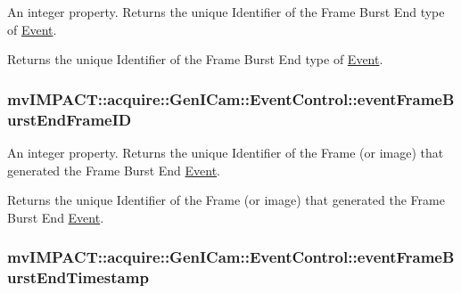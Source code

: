 An integer property. Returns the unique Identifier of the Frame Burst End type of \hyperlink{classmv_i_m_p_a_c_t_1_1acquire_1_1_event}{Event}. 

Returns the unique Identifier of the Frame Burst End type of \hyperlink{classmv_i_m_p_a_c_t_1_1acquire_1_1_event}{Event}. \hypertarget{classmv_i_m_p_a_c_t_1_1acquire_1_1_gen_i_cam_1_1_event_control_a04c309b663ab1b9c28994c92e19e8b6a}{
\subsubsection[{event\+Frame\+Burst\+End\+Frame\+I\+D}]{ mv\+I\+M\+P\+A\+C\+T\+::acquire\+::\+Gen\+I\+Cam\+::\+Event\+Control\+::event\+Frame\+Burst\+End\+Frame\+I\+D}}\label{classmv_i_m_p_a_c_t_1_1acquire_1_1_gen_i_cam_1_1_event_control_a04c309b663ab1b9c28994c92e19e8b6a}


An integer property. Returns the unique Identifier of the Frame (or image) that generated the Frame Burst End \hyperlink{classmv_i_m_p_a_c_t_1_1acquire_1_1_event}{Event}. 

Returns the unique Identifier of the Frame (or image) that generated the Frame Burst End \hyperlink{classmv_i_m_p_a_c_t_1_1acquire_1_1_event}{Event}. \hypertarget{classmv_i_m_p_a_c_t_1_1acquire_1_1_gen_i_cam_1_1_event_control_a9a3c7323088388618d23ecbf363221f3}{
\subsubsection[{event\+Frame\+Burst\+End\+Timestamp}]{ mv\+I\+M\+P\+A\+C\+T\+::acquire\+::\+Gen\+I\+Cam\+::\+Event\+Control\+::event\+Frame\+Burst\+End\+Timestamp}}\label{classmv_i_m_p_a_c_t_1_1acquire_1_1_gen_i_cam_1_1_event_control_a9a3c7323088388618d23ecbf363221f3}


